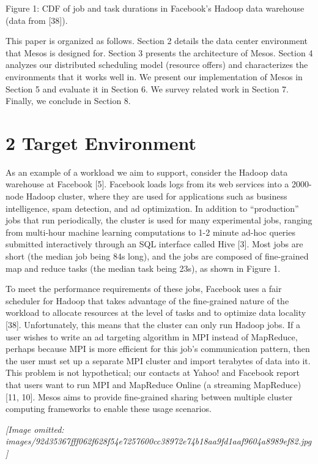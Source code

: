 \documentclass[
]{article}
\begin{document}
Figure 1: CDF of job and task durations in Facebook's Hadoop data
warehouse (data from {[}38{]}).

This paper is organized as follows. Section 2 details the data center
environment that Mesos is designed for. Section 3 presents the
architecture of Mesos. Section 4 analyzes our distributed scheduling
model (resource offers) and characterizes the environments that it works
well in. We present our implementation of Mesos in Section 5 and
evaluate it in Section 6. We survey related work in Section 7. Finally,
we conclude in Section 8.

\section{2 Target Environment}\label{target-environment}

As an example of a workload we aim to support, consider the Hadoop data
warehouse at Facebook {[}5{]}. Facebook loads logs from its web services
into a 2000-node Hadoop cluster, where they are used for applications
such as business intelligence, spam detection, and ad optimization. In
addition to ``production'' jobs that run periodically, the cluster is
used for many experimental jobs, ranging from multi-hour machine
learning computations to 1-2 minute ad-hoc queries submitted
interactively through an SQL interface called Hive {[}3{]}. Most jobs
are short (the median job being 84s long), and the jobs are composed of
fine-grained map and reduce tasks (the median task being 23s), as shown
in Figure 1.

To meet the performance requirements of these jobs, Facebook uses a fair
scheduler for Hadoop that takes advantage of the fine-grained nature of
the workload to allocate resources at the level of tasks and to optimize
data locality {[}38{]}. Unfortunately, this means that the cluster can
only run Hadoop jobs. If a user wishes to write an ad targeting
algorithm in MPI instead of MapReduce, perhaps because MPI is more
efficient for this job's communication pattern, then the user must set
up a separate MPI cluster and import terabytes of data into it. This
problem is not hypothetical; our contacts at Yahoo! and Facebook report
that users want to run MPI and MapReduce Online (a streaming MapReduce)
{[}11, 10{]}. Mesos aims to provide fine-grained sharing between
multiple cluster computing frameworks to enable these usage scenarios.

\textit{[Image omitted: images/92d35367fff062f628f54e7257600cc38972e74b18aa9fd1aaf9604a8989ef82.jpg]}
\end{document}
